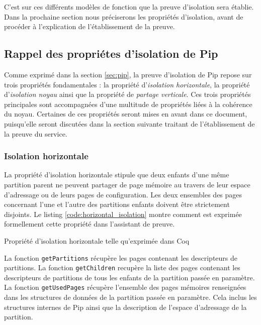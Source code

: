 		C'est sur ces différents modèles de fonction que la preuve d'isolation sera établie. Dans la prochaine section nous préciserons les propriétés d'isolation, avant de procéder à l'explication de l'établissement de la preuve.

		\subsection{Rappel des propriétes d'isolation de Pip}

		Comme exprimé dans la section \ref{sec:pip}, la preuve d'isolation de Pip repose sur trois propriétés fondamentales : la propriété d'\emph{isolation horizontale}, la propriété d'\emph{isolation noyau} ainsi que la propriété de \emph{partage verticale}. Ces trois propriétés principales sont accompagnées d'une multitude de propriétés liées à la cohérence du noyau. Certaines de ces propriétés seront mises en avant dans ce document, puisqu'elle seront discutées dans la section suivante traitant de l'établissement de la preuve du service.

			\subsubsection{Isolation horizontale}

			La propriété d'isolation horizontale stipule que deux enfants d'une même partition parent ne peuvent partager de page mémoire au travers de leur espace d'adressage ou de leurs pages de configuration. Les deux ensembles des pages concernant l'une et l'autre des partitions enfants doivent être strictement disjoints. Le listing \ref{code:horizontal_isolation} montre comment est exprimée formellement cette propriété dans l'assistant de preuve.

			\begin{listing}[!ht]
				\caption{Propriété d'isolation horizontale telle qu'exprimée dans Coq}
				\label{code:horizontal_isolation}
			\end{listing}

			La fonction \texttt{getPartitions} récupère les pages contenant les descripteurs de partitions. La fonction \texttt{getChildren} recupère la liste des pages contenant les descripteurs de partitions de tous les enfants de la partition passée en paramètre. La fonction \texttt{getUsedPages} récupère l'ensemble des pages mémoires renseignées dans les structures de données de la partition passée en paramètre. Cela inclus les structures internes de Pip ainsi que la description de l'espace d'adressage de la partition.

